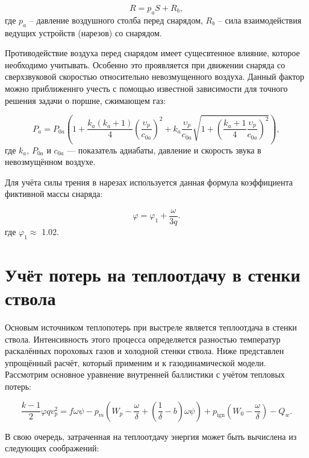 \documentclass[14pt, a4paper]{report} %
\begin{document}
\begin{equation}
R = p_a S + R_b,
\end{equation}
где $p_a$ -- давление воздушного столба перед снарядом, $R_b$ -- сила взаимодействия ведущих устройств (нарезов)
со снарядом.

Противодействие воздуха перед снарядом имеет сущесвтенное влияние, которое необходимо учитывать. Особенно это проявляется при движении снаряда 
со сверхзвуковой скоростью относительно невозмущенного воздуха. Данный фактор можно приближеннго учесть с помощью известной зависимости для точного решения задачи о поршне, сжимающем газ:

\begin{equation}
P_a = P_{0a} \left(1 + \frac{k_a(k_a+1)}{4} \left(\frac{\upsilon_p}{c_{0a}}\right)^2 + 
k_a \frac{\upsilon_p}{c_{0a}} \sqrt{1 + \left(\frac{k_a+1}{4} \frac{\upsilon_p}{c_{0a}}\right)^2} \right),
\end{equation}
где $k_a$, $P_{0a}$ и $c_{0a}$ — показатель адиабаты, давление и скорость звука в невозмущённом воздухе.

Для учёта силы трения в нарезах используется данная формула коэффициента фиктивной массы снаряда: 

\begin{equation}
\varphi = \varphi_1 + \frac{\omega}{3q}.
\label{eq:phi_equation}
\end{equation}
где $\varphi_1 \approx$  1.02.

\section{Учёт потерь на теплоотдачу в стенки ствола}

Основым источником теплопотерь при выстреле является теплоотдача в стенки ствола. Интенсивность этого процесса определяется разностью температур раскалённых пороховых газов и холодной стенки ствола. Ниже представлен упрощённый расчёт, который применим и к газодинамической модели.
Рассмотрим основное уравнение внутренней баллистики с учётом тепловых потерь:

\begin{equation}
\frac{k-1}{2} \varphi q v_p^2 = f \omega \psi - p_m \left( W_p - \frac{\omega}{\delta} + \left( \frac{1}{\delta} - b \right) \omega \psi \right) + p_{\text{ign}} \left( W_0 - \frac{\omega}{\delta} \right) - Q_w.
\end{equation}

В свою очередь, затраченная на теплоотдачу энергия может быть вычислена из следующих соображений:
\end{document}
